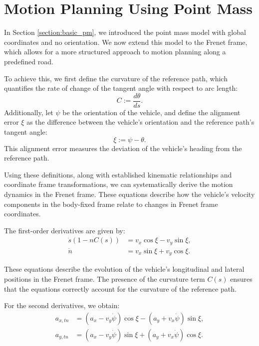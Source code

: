 \section{Motion Planning Using Point Mass} \label{sec:motion_planning_using_point_mass}

In Section \ref{section:basic_pm}, we introduced the point mass model with global coordinates and no orientation.
We now extend this model to the Frenet frame, which allows for a more structured approach to motion planning along a predefined road.

To achieve this, we first define the curvature of the reference path, which quantifies the rate of change of the tangent angle with respect to arc length:
\begin{equation}
	C := \frac{d\theta}{ds}.
\end{equation}
Additionally, let $\psi$ be the orientation of the vehicle, and define the alignment error $\xi$ as the difference between the vehicle's orientation and the reference path's tangent angle:
\begin{equation}
	\xi := \psi - \theta.
\end{equation}
This alignment error measures the deviation of the vehicle's heading from the reference path.

Using these definitions, along with established kinematic relationships and coordinate frame transformations, we can systematically derive the motion
dynamics in the Frenet frame.
These equations describe how the vehicle's velocity components in the body-fixed frame relate to changes in Frenet frame coordinates.

The first-order derivatives are given by:
\begin{align}
	\dot{s}(1 - nC(s)) & = v_x\cos{\xi} - v_y\sin{\xi}, \label{eq:first_derivative_long} \\
	\dot{n}            & = v_x\sin{\xi} + v_y\cos{\xi}. \label{eq:first_derivative_lat}
\end{align}

These equations describe the evolution of the vehicle's longitudinal and lateral positions in the Frenet frame.
The presence of the curvature term $C(s)$ ensures that the equations correctly account for the curvature of the reference path.

For the second derivatives, we obtain:
\begin{align}
	a_{x,tn} & = (a_x - v_y\dot{\psi})\cos{\xi} - (a_y + v_x\dot{\psi})\sin{\xi}, \label{eq:second_derivative_long} \\
	a_{y,tn} & = (a_x - v_y\dot{\psi})\sin{\xi} + (a_y + v_x\dot{\psi})\cos{\xi}. \label{eq:second_derivative_lat}
\end{align}

